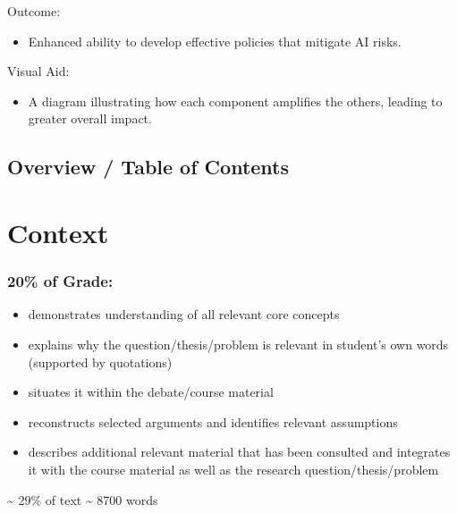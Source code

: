 \documentclass[
  letterpaper,
]{book}
\providecommand{\tightlist}{%
  \setlength{\itemsep}{0pt}\setlength{\parskip}{0pt}}
\begin{document}
Outcome:

\begin{itemize}
\tightlist
\item
  Enhanced ability to develop effective policies that mitigate AI risks.
\end{itemize}

Visual Aid:

\begin{itemize}
\tightlist
\item
  A diagram illustrating how each component amplifies the others,
  leading to greater overall impact.
\end{itemize}

\section{}\label{section}

\section{Overview / Table of Contents}\label{overview-table-of-contents}


\chapter{Context}\label{context}

\subsection{20\% of Grade:}\label{of-grade}

\begin{itemize}
\item
  demonstrates understanding of all relevant core concepts
\item
  explains why the question/thesis/problem is relevant in student's own
  words (supported by quotations)
\item
  situates it within the debate/course material
\item
  reconstructs selected arguments and identifies relevant assumptions
\item
  describes additional relevant material that has been consulted and
  integrates it with the course material as well as the research
  question/thesis/problem
\end{itemize}

\textasciitilde{} 29\% of text \textasciitilde{} 8700 words
\end{document}
